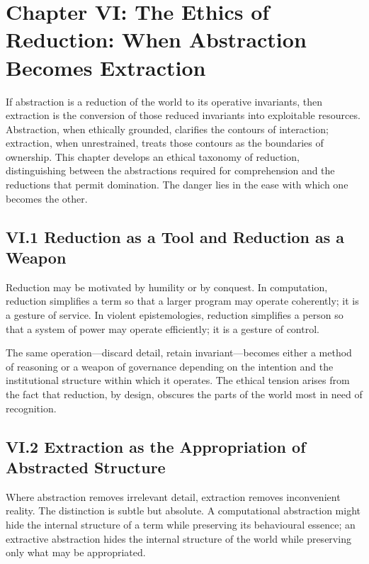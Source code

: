 \documentclass[12pt,letterpaper]{article}
\begin{document}
\section{Chapter VI: The Ethics of Reduction: When Abstraction Becomes Extraction}

If abstraction is a reduction of the world to its operative invariants, then extraction is the conversion of those reduced invariants into exploitable resources. Abstraction, when ethically grounded, clarifies the contours of interaction; extraction, when unrestrained, treats those contours as the boundaries of ownership. This chapter develops an ethical taxonomy of reduction, distinguishing between the abstractions required for comprehension and the reductions that permit domination. The danger lies in the ease with which one becomes the other.

\subsection{VI.1 Reduction as a Tool and Reduction as a Weapon}

Reduction may be motivated by humility or by conquest. In computation, reduction simplifies a term so that a larger program may operate coherently; it is a gesture of service. In violent epistemologies, reduction simplifies a person so that a system of power may operate efficiently; it is a gesture of control.

The same operation—discard detail, retain invariant—becomes either a method of reasoning or a weapon of governance depending on the intention and the institutional structure within which it operates. The ethical tension arises from the fact that reduction, by design, obscures the parts of the world most in need of recognition.

\subsection{VI.2 Extraction as the Appropriation of Abstracted Structure}

Where abstraction removes irrelevant detail, extraction removes inconvenient reality. The distinction is subtle but absolute. A computational abstraction might hide the internal structure of a term while preserving its behavioural essence; an extractive abstraction hides the internal structure of the world while preserving only what may be appropriated.
\end{document}
